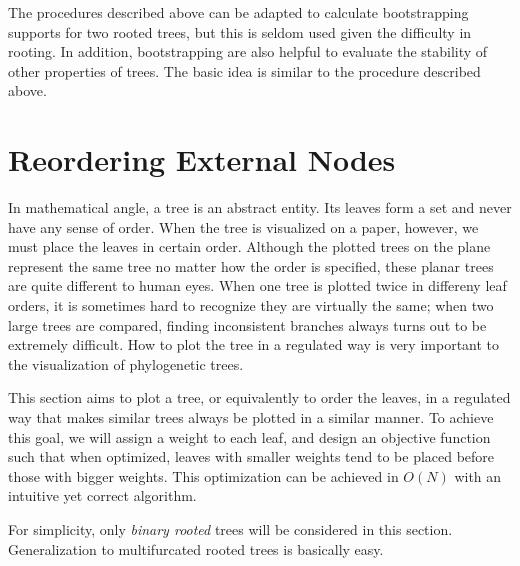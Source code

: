 The procedures described above can be adapted to calculate bootstrapping supports for two rooted trees,
but this is seldom used given the difficulty in rooting. In addition,
bootstrapping are also helpful to evaluate the stability of other properties of trees.
The basic idea is similar to the procedure described above.

\section{Reordering External Nodes}\label{sec:reorder}
In mathematical angle, a tree is an abstract entity. Its leaves form a set and never have
any sense of order. When the tree is visualized on a paper, however, we must place
the leaves in certain order. Although the plotted trees on the plane represent the
same tree no matter how the order is specified, these planar trees are quite different to
human eyes. When one tree is plotted twice in differeny leaf orders, it is sometimes hard to recognize they are virtually the same;
when two large trees are compared, finding inconsistent branches always turns out to
be extremely difficult. How to plot the tree in a regulated way is very important to the visualization
of phylogenetic trees.

This section aims to plot a tree, or equivalently to order the leaves, in a regulated way that
makes similar trees always be plotted in a similar manner. To achieve this goal,
we will assign a weight to each leaf, and design an objective function such that
when optimized, leaves with smaller weights tend to be placed before those with
bigger weights. This optimization can be achieved in $O(N)$ with an intuitive yet
correct algorithm.

For simplicity, only \emph{binary rooted} trees will be considered in this section.
Generalization to multifurcated rooted trees is basically easy.

